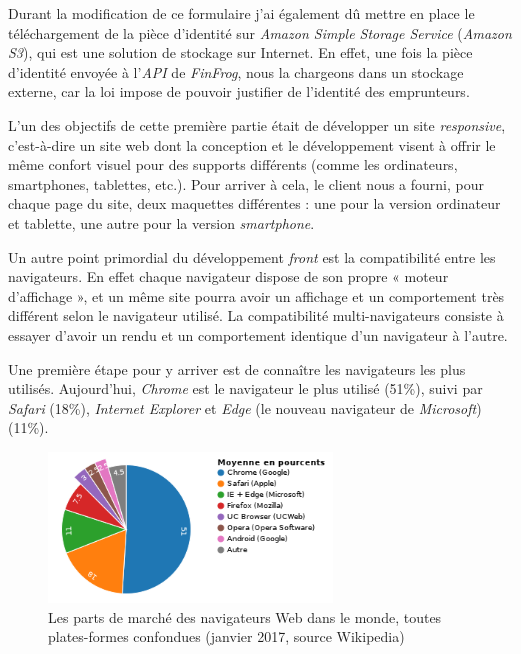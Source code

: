 \documentclass[12pt,a4paper]{article}
\begin{document}
  \bigskip

  Durant la modification de ce formulaire j'ai également dû mettre en
  place le téléchargement de la pièce d'identité sur \emph{Amazon Simple
  Storage Service} (\emph{Amazon S3}), qui est une solution de stockage
  sur Internet. En effet, une fois la pièce d'identité envoyée à
  l'\emph{API} de \emph{FinFrog}, nous la chargeons dans un stockage
  externe, car la loi impose de pouvoir justifier de l'identité des
  emprunteurs.

  \bigskip

  L'un des objectifs de cette première partie était de développer un site
  \emph{responsive}, c'est-à-dire un site web dont la conception et le
  développement visent à offrir le même confort visuel pour des supports
  différents (comme les ordinateurs, smartphones, tablettes, etc.). Pour
  arriver à cela, le client nous a fourni, pour chaque page du site, deux
  maquettes différentes : une pour la version ordinateur et tablette, une
  autre pour la version \emph{smartphone}.

  \bigskip

  Un autre point primordial du développement \emph{front} est la
  compatibilité entre les navigateurs. En effet chaque navigateur dispose
  de son propre « moteur d'affichage », et un même site pourra avoir un
  affichage et un comportement très différent selon le navigateur utilisé.
  La compatibilité multi-navigateurs consiste à essayer d'avoir un rendu
  et un comportement identique d'un navigateur à l'autre.

  \bigskip

  Une première étape pour y arriver est de connaître les navigateurs les
  plus utilisés. Aujourd'hui, \emph{Chrome} est le navigateur le plus
  utilisé (51\%), suivi par \emph{Safari} (18\%), \emph{Internet Explorer}
  et \emph{Edge} (le nouveau navigateur de \emph{Microsoft}) (11\%).

  \begin{figure}[h]
    \centering
    \includegraphics[height=4cm]{figures/browsers.png}
    \caption{Les parts de marché des navigateurs Web dans le monde, toutes plates-formes confondues (janvier 2017, source Wikipedia)}
  \end{figure}
\end{document}
